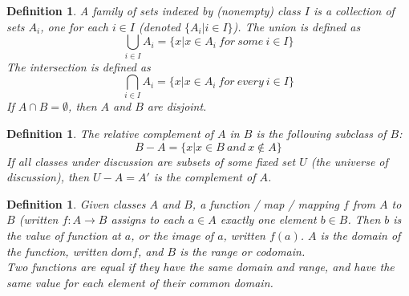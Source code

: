 \documentclass[a4paper,8pt]{article}
\theoremstyle{theorem}
\newtheorem{definition}[theorem]{Definition}
\begin{document}
\begin{definition}
A \textit{{\color{blue} family of sets}} indexed by (nonempty) class $ I $ is a collection of sets $ A_i $, one for each $ i \in I $ (denoted $\{ A_i | i \in I \}$).\newline
The \textit{{\color{blue} union}} is defined as 
\begin{equation}
\bigcup\limits_{i \in I}A_{i} = \{ x | x \in A_i \ for \ some \ i \in I \} \nonumber
\end{equation}
The \textit{{\color{blue} intersection}} is defined as 
\begin{equation}
\bigcap\limits_{i \in I}A_{i} = \{ x | x \in A_i \ for \ every \ i \in I \} \nonumber
\end{equation}
If $ A \cap B = \emptyset $, then $ A $ and $ B $ are disjoint.\\
\end{definition}


\begin{definition}
The \textit{{\color{blue} relative complement}} of $ A $ in $ B $ is the following subclass of $ B $: \\
\begin{equation}
B-A = \{ x | x \in B \ and \ x \notin A \} \nonumber
\end{equation}
If all classes under discussion are subsets of some fixed set $ U $ (the universe of discussion), then $ U - A = A' $ is the \textit{{\color{blue} complement}} of $ A $.\\
\end{definition}


\begin{definition}
Given classes $ A $ and $ B $, a \textit{{\color{blue} function / map / mapping}} $ f $ from $ A $ to $ B $ (written $ f: A \rightarrow B $ assigns to each $ a \in A $ exactly one element $ b \in B $.\newline
Then $ b $ is the value of function at $ a $, or the \textit{{\color{blue} image}} of $ a $, written $ f(a) $.\newline
$ A $ is the \textit{{\color{blue} domain}} of the function, written $ dom f $, and $ B $ is the \textit{{\color{blue} range}} or \textit{{\color{blue} codomain}}.\\
Two functions are \textit{{\color{blue} equal}} if they have the same domain and range, and have the same value for each element of their common domain.\\
\end{definition}
\end{document}
